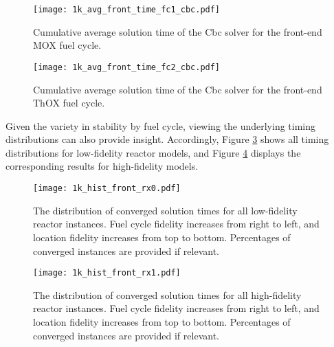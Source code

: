 \begin{figure}[h!]
  \begin{center}
    \texttt{[image: 1k\_avg\_front\_time\_fc1\_cbc.pdf]}
    \caption[]{
      \label{fig:1k_avg_front_time_fc1_cbc}
      Cumulative average solution time of the Cbc solver for the front-end MOX
      fuel cycle.}
  \end{center}
\end{figure}

\begin{figure}[h!]
  \begin{center}
    \texttt{[image: 1k\_avg\_front\_time\_fc2\_cbc.pdf]}
    \caption[]{
      \label{fig:1k_avg_front_time_fc2_cbc}
      Cumulative average solution time of the Cbc solver for the front-end ThOX
      fuel cycle.}
  \end{center}
\end{figure}

Given the variety in stability by fuel cycle, viewing the underlying timing
distributions can also provide insight. Accordingly, Figure
\ref{fig:1k_hist_front_rx0} shows all timing distributions for low-fidelity
reactor models, and Figure \ref{fig:1k_hist_front_rx1} displays the
corresponding results for high-fidelity models.

\begin{figure}[h!]
  \begin{center}
    \texttt{[image: 1k\_hist\_front\_rx0.pdf]}
    \caption[]{
      \label{fig:1k_hist_front_rx0}
      The distribution of converged solution times for all low-fidelity reactor
      instances. Fuel cycle fidelity increases from right to left, and location
      fidelity increases from top to bottom. Percentages of converged instances
      are provided if relevant.}
  \end{center}
\end{figure}

\begin{figure}[h!]
  \begin{center}
    \texttt{[image: 1k\_hist\_front\_rx1.pdf]}
    \caption[]{
      \label{fig:1k_hist_front_rx1}
      The distribution of converged solution times for all high-fidelity reactor
      instances. Fuel cycle fidelity increases from right to left, and location
      fidelity increases from top to bottom. Percentages of converged instances
      are provided if relevant.}
  \end{center}
\end{figure}

